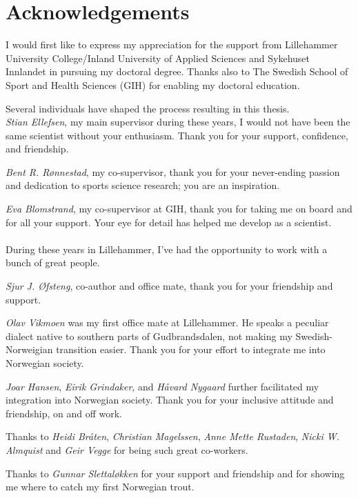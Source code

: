 \documentclass[twoside,10pt]{gihclass} %
\begin{document}
\hypertarget{acknowledgements}{%
\chapter{Acknowledgements}\label{acknowledgements}}

I would first like to express my appreciation for the support from Lillehammer University College/Inland University of Applied Sciences and Sykehuset Innlandet in pursuing my doctoral degree. Thanks also to The Swedish School of Sport and Health Sciences (GIH) for enabling my doctoral education.

\hfill\break
Several individuals have shaped the process resulting in this thesis.\\

\emph{Stian Ellefsen}, my main supervisor during these years, I would not have been the same scientist without your enthusiasm. Thank you for your support, confidence, and friendship.

\emph{Bent R. Rønnestad}, my co-supervisor, thank you for your never-ending passion and dedication to sports science research; you are an inspiration.

\emph{Eva Blomstrand}, my co-supervisor at GIH, thank you for taking me on board and for all your support. Your eye for detail has helped me develop as a scientist.\\
~\\

During these years in Lillehammer, I've had the opportunity to work with a bunch of great people.

\emph{Sjur J. Øfsteng}, co-author and office mate, thank you for your friendship and support.

\emph{Olav Vikmoen} was my first office mate at Lillehammer. He speaks a peculiar dialect native to southern parts of Gudbrandsdalen, not making my Swedish-Norweigian transition easier. Thank you for your effort to integrate me into Norwegian society.

\emph{Joar Hansen}, \emph{Eirik Grindaker}, and \emph{Håvard Nygaard} further facilitated my integration into Norwegian society. Thank you for your inclusive attitude and friendship, on and off work.

Thanks to \emph{Heidi Bråten}, \emph{Christian Magelssen}, \emph{Anne Mette Rustaden}, \emph{Nicki W. Almquist} and \emph{Geir Vegge} for being such great co-workers.

Thanks to \emph{Gunnar Slettaløkken} for your support and friendship and for showing me where to catch my first Norwegian trout.
\end{document}
